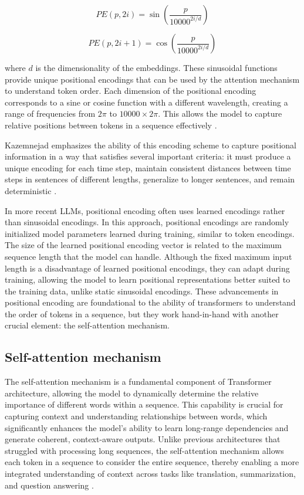 \begin{equation}
    PE(p, 2i) = \sin\left(\frac{p}{10000^{2i/d}}\right)
\end{equation}

\begin{equation}
PE(p, 2i + 1) = \cos\left(\frac{p}{10000^{2i/d}}\right)
\end{equation}

where \( d \) is the dimensionality of the embeddings. These sinusoidal functions provide unique positional encodings that can be used by the attention mechanism to understand token order. Each dimension of the positional encoding corresponds to a sine or cosine function with a different wavelength, creating a range of frequencies from \( 2\pi \) to \( 10000 \times 2\pi \). This allows the model to capture relative positions between tokens in a sequence effectively \cite{vaswani2017attention}.

Kazemnejad emphasizes the ability of this encoding scheme to capture positional information in a way that satisfies several important criteria: it must produce a unique encoding for each time step, maintain consistent distances between time steps in sentences of different lengths, generalize to longer sentences, and remain deterministic \cite{kazemnejad2019:pencoding}.

In more recent LLMs, positional encoding often uses learned encodings rather than sinusoidal encodings. In this approach, positional encodings are randomly initialized model parameters learned during training, similar to token encodings. The size of the learned positional encoding vector is related to the maximum sequence length that the model can handle. Although the fixed maximum input length is a disadvantage of learned positional encodings, they can adapt during training, allowing the model to learn positional representations better suited to the training data, unlike static sinusoidal encodings. These advancements in positional encoding are foundational to the ability of transformers to understand the order of tokens in a sequence, but they work hand-in-hand with another crucial element: the self-attention mechanism.

\subsection{Self-attention mechanism}

The self-attention mechanism is a fundamental component of Transformer architecture, allowing the model to dynamically determine the relative importance of different words within a sequence. This capability is crucial for capturing context and understanding relationships between words, which significantly enhances the model's ability to learn long-range dependencies and generate coherent, context-aware outputs. Unlike previous architectures that struggled with processing long sequences, the self-attention mechanism allows each token in a sequence to consider the entire sequence, thereby enabling a more integrated understanding of context across tasks like translation, summarization, and question answering \cite{vaswani2017attention}.


